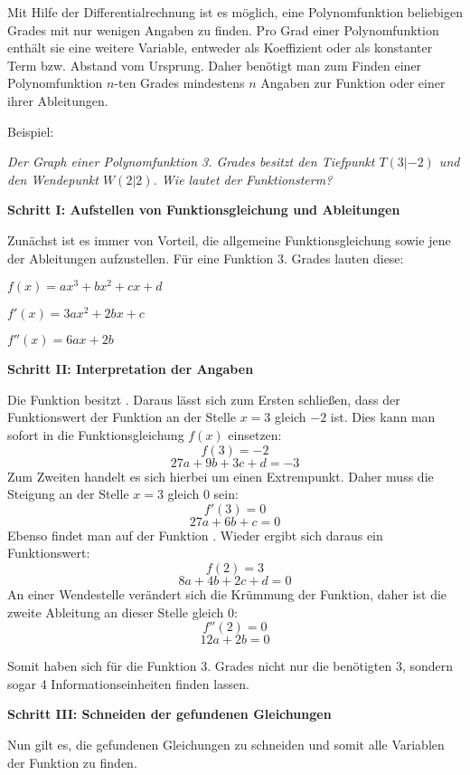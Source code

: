 
Mit Hilfe der Differentialrechnung ist es m\"{o}glich, eine Polynomfunktion beliebigen Grades mit nur wenigen Angaben zu finden. Pro Grad einer Polynomfunktion enth\"{a}lt sie eine weitere Variable, entweder als Koeffizient oder als konstanter Term bzw. Abstand vom Ursprung. Daher ben\"{o}tigt man zum Finden einer Polynomfunktion $n$-ten Grades mindestens $n$ Angaben zur Funktion oder einer ihrer Ableitungen.

Beispiel:

\emph{Der Graph einer Polynomfunktion 3. Grades besitzt den Tiefpunkt $T(3|-2)$ und den Wendepunkt $W(2|2)$. Wie lautet der Funktionsterm?}

\textbf{Schritt I: Aufstellen von Funktionsgleichung und Ableitungen}

Zun\"{a}chst ist es immer von Vorteil, die allgemeine Funktionsgleichung sowie jene der Ableitungen aufzustellen. F\"{u}r eine Funktion 3. Grades lauten diese:

$f(x) = ax^3 + bx^2 + cx + d$

$f'(x) = 3ax^2 + 2bx + c$

$f''(x) = 6ax + 2b$

\textbf{Schritt II: Interpretation der Angaben}

Die Funktion besitzt . Daraus l\"{a}sst sich zum Ersten schlie\ss{}en, dass der Funktionswert der Funktion an der Stelle $x = 3$ gleich $-2$ ist. Dies kann man sofort in die Funktionsgleichung $f(x)$ einsetzen: $$f(3) = -2$$ $$27a + 9b + 3c + d = -3$$ Zum Zweiten handelt es sich hierbei um einen Extrempunkt. Daher muss die Steigung an der Stelle $x = 3$ gleich $0$ sein: $$f'(3) = 0$$ $$27a + 6b + c = 0$$ Ebenso findet man auf der Funktion . Wieder ergibt sich daraus ein Funktionswert: $$f(2) = 3$$ $$8a + 4b + 2c + d = 0$$ An einer Wendestelle ver\"{a}ndert sich die Kr\"{u}mmung der Funktion, daher ist die zweite Ableitung an dieser Stelle gleich 0: $$f''(2) = 0$$ $$12a + 2b = 0$$

Somit haben sich f\"{u}r die Funktion 3. Grades nicht nur die ben\"{o}tigten 3, sondern sogar 4 Informationseinheiten finden lassen.

\pagebreak

\textbf{Schritt III: Schneiden der gefundenen Gleichungen}

Nun gilt es, die gefundenen Gleichungen zu schneiden und somit alle Variablen der Funktion zu finden.

